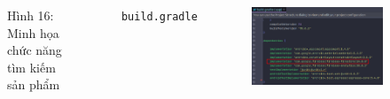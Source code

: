 \documentclass{beamer}
\begin{document}
\begin{frame}
\begin{columns}
\begin{figure}
            \caption{\centering\tiny{Hình 16: Minh họa chức năng tìm kiếm sản phẩm}}
        \end{figure}
        \indent \texttt{build.gradle}
        \begin{figure}
            \centering
            \includegraphics[width=\textwidth]{images/43.png}
        \end{figure}
    \end{columns}
\end{frame}
\end{document}
